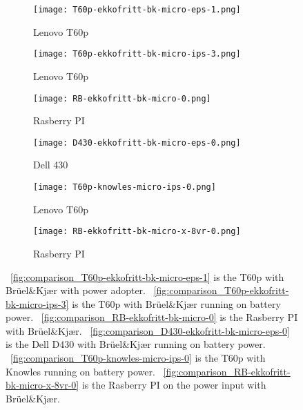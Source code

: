 \begin{figure}[ht]
    \centering
    \begin{subfigure}{0.32\textwidth}
        \centering
        \texttt{[image: T60p-ekkofritt-bk-micro-eps-1.png]}
        \caption{Lenovo T60p}
        \label{fig:comparison_T60p-ekkofritt-bk-micro-eps-1}
    \end{subfigure}
    \begin{subfigure}{0.32\textwidth}
        \centering
        \texttt{[image: T60p-ekkofritt-bk-micro-ips-3.png]}
        \caption{Lenovo T60p}
        \label{fig:comparison_T60p-ekkofritt-bk-micro-ips-3}
    \end{subfigure}
    \begin{subfigure}{0.32\textwidth}
        \centering
        \texttt{[image: RB-ekkofritt-bk-micro-0.png]}
        \caption{Rasberry PI}
        \label{fig:comparison_RB-ekkofritt-bk-micro-0}
    \end{subfigure}
    \begin{subfigure}{0.32\textwidth}
        \centering
        \texttt{[image: D430-ekkofritt-bk-micro-eps-0.png]}
        \caption{Dell 430}
        \label{fig:comparison_D430-ekkofritt-bk-micro-eps-0}
    \end{subfigure}
    \begin{subfigure}{0.32\textwidth}
        \centering
        \texttt{[image: T60p-knowles-micro-ips-0.png]}
        \caption{Lenovo T60p}
        \label{fig:comparison_T60p-knowles-micro-ips-0}
    \end{subfigure}
    \begin{subfigure}{0.32\textwidth}
        \centering
        \texttt{[image: RB-ekkofritt-bk-micro-x-8vr-0.png]}
        \caption{Rasberry PI}
        \label{fig:comparison_RB-ekkofritt-bk-micro-x-8vr-0}
    \end{subfigure}
    \caption{
    ~\autoref{fig:comparison_T60p-ekkofritt-bk-micro-eps-1} is the T60p with Brüel\&Kjær with power adopter.
    ~\autoref{fig:comparison_T60p-ekkofritt-bk-micro-ips-3} is the T60p with Brüel\&Kjær running on battery power.
    ~\autoref{fig:comparison_RB-ekkofritt-bk-micro-0} is the Rasberry PI with Brüel\&Kjær.
    ~\autoref{fig:comparison_D430-ekkofritt-bk-micro-eps-0} is the Dell D430 with Brüel\&Kjær running on battery power.
    ~\autoref{fig:comparison_T60p-knowles-micro-ips-0} is the T60p with Knowles running on battery power.
    ~\autoref{fig:comparison_RB-ekkofritt-bk-micro-x-8vr-0} is the Rasberry PI on the power input with Brüel\&Kjær.}
    \label{fig:comparison_micorinstructions}
\end{figure}
